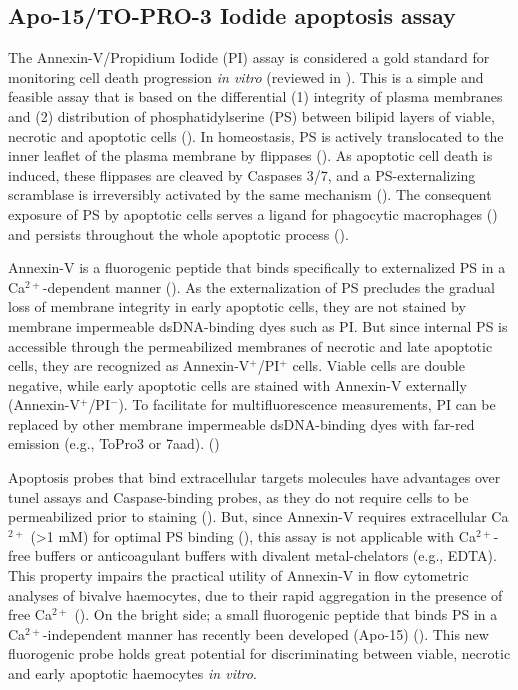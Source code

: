 \subsection{Apo-15/TO-PRO-3 Iodide apoptosis assay}
The Annexin-V/Propidium Iodide (PI) assay is considered a gold standard for monitoring cell death progression \emph{in vitro} (reviewed in \cite{VanEngeland1998}). This is a simple and feasible assay that is based on the differential (1) integrity of plasma membranes and (2) distribution of phosphatidylserine (PS) between bilipid layers of viable, necrotic and apoptotic cells (\cite{Jiang2016}). In homeostasis, PS is actively translocated to the inner leaflet of the plasma membrane by flippases (\cite{Connor1992}). As apoptotic cell death is induced, these flippases are cleaved by Caspases 3/7, and a PS-externalizing scramblase is irreversibly activated by the same mechanism (\cite{Verhoven1995, Suzuki2013}). The consequent exposure of PS by apoptotic cells serves a ligand for phagocytic macrophages (\cite{Fadok1992}) and persists throughout the whole apoptotic process (\cite{Martin1995}).

Annexin-V is a fluorogenic peptide that binds specifically to externalized PS in a Ca$^{2+}$-dependent manner (\cite{Andree1990, Martin1995}). As the externalization of PS precludes the gradual loss of membrane integrity in early apoptotic cells, they are not stained by membrane impermeable dsDNA-binding dyes such as PI. But since internal PS is accessible through the permeabilized membranes of necrotic and late apoptotic cells, they are recognized as Annexin-V$^{+}$/PI$^{+}$ cells. Viable cells are double negative, while early apoptotic cells are stained with Annexin-V externally (Annexin-V$^{+}$/PI$^{-}$). To facilitate for multifluorescence measurements, PI can be replaced by other membrane impermeable dsDNA-binding dyes with far-red emission (e.g., ToPro3 or \acrshort{7aad}). (\cite{Jiang2016})

Apoptosis probes that bind extracellular targets molecules have advantages over \acrshort{tunel} assays and Caspase-binding probes, as they do not require cells to be permeabilized prior to staining (\cite{DelBino1999}). But, since Annexin-V requires extracellular Ca$^{2+}$ (>1 mM) for optimal PS binding (\cite{Andree1990}), this assay is not applicable with Ca$^{2+}$-free buffers or anticoagulant buffers with divalent metal-chelators (e.g., EDTA). This property impairs the practical utility of Annexin-V in flow cytometric analyses of bivalve haemocytes, due to their rapid aggregation in the presence of free Ca$^{2+}$ (\cite{Torreilles1999}). On the bright side; a small fluorogenic peptide that binds PS in a Ca$^{2+}$-independent manner has recently been developed (Apo-15) (\cite{Barth2020}). This new fluorogenic probe holds great potential for discriminating between viable, necrotic and early apoptotic haemocytes \emph{in vitro}.

